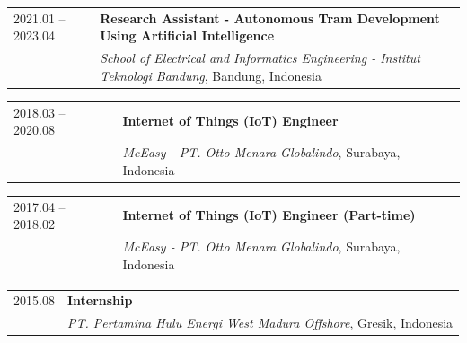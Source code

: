 \noindent
\begin{tabularx}{\linewidth}{@{}l X@{}}
  2021.01 -- 2023.04 & \textbf{Research Assistant - Autonomous Tram Development Using Artificial Intelligence} \\
                              & \textit{School of Electrical and Informatics Engineering - Institut Teknologi Bandung}, Bandung, Indonesia \\
\end{tabularx}\vspace{4pt}

\noindent
\begin{tabularx}{\linewidth}{@{}l X@{}}
  2018.03 -- 2020.08 & \textbf{Internet of Things (IoT) Engineer} \\
                              & \textit{McEasy - PT. Otto Menara Globalindo}, Surabaya, Indonesia \\
\end{tabularx}\vspace{4pt}

\noindent
\begin{tabularx}{\linewidth}{@{}l X@{}}
  2017.04 -- 2018.02 & \textbf{Internet of Things (IoT) Engineer (Part-time)} \\
                              & \textit{McEasy - PT. Otto Menara Globalindo}, Surabaya, Indonesia \\
\end{tabularx}\vspace{4pt}

\noindent
\begin{tabularx}{\linewidth}{@{}l X@{}}
  2015.08\phantom{ -- 2024.01} & \textbf{Internship} \\
                                        & \textit{PT. Pertamina Hulu Energi West Madura Offshore}, Gresik, Indonesia \\
\end{tabularx}